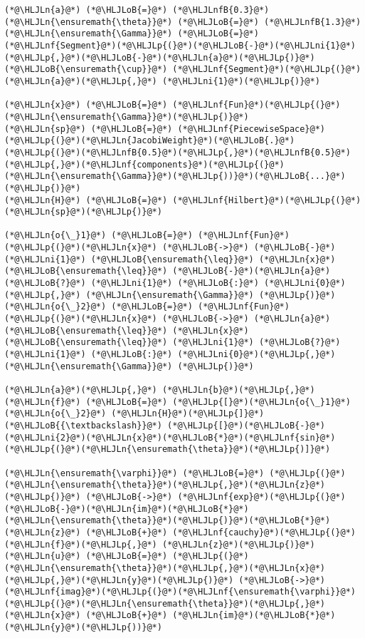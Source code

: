 \documentclass[12pt,a4paper]{article}
\newcommand{\HLJLn}[1]{#1}
\newcommand{\HLJLnf}[1]{\textcolor[RGB]{66,102,213}{#1}}
\newcommand{\HLJLnfB}[1]{\textcolor[RGB]{59,151,46}{#1}}
\newcommand{\HLJLni}[1]{\textcolor[RGB]{59,151,46}{#1}}
\newcommand{\HLJLoB}[1]{\textcolor[RGB]{102,102,102}{\textbf{#1}}}
\newcommand{\HLJLp}[1]{#1}
\begin{document}
\begin{lstlisting}
(*@\HLJLn{a}@*) (*@\HLJLoB{=}@*) (*@\HLJLnfB{0.3}@*)
(*@\HLJLn{\ensuremath{\theta}}@*) (*@\HLJLoB{=}@*) (*@\HLJLnfB{1.3}@*)
(*@\HLJLn{\ensuremath{\Gamma}}@*) (*@\HLJLoB{=}@*) (*@\HLJLnf{Segment}@*)(*@\HLJLp{(}@*)(*@\HLJLoB{-}@*)(*@\HLJLni{1}@*)(*@\HLJLp{,}@*)(*@\HLJLoB{-}@*)(*@\HLJLn{a}@*)(*@\HLJLp{)}@*) (*@\HLJLoB{\ensuremath{\cup}}@*) (*@\HLJLnf{Segment}@*)(*@\HLJLp{(}@*)(*@\HLJLn{a}@*)(*@\HLJLp{,}@*) (*@\HLJLni{1}@*)(*@\HLJLp{)}@*)

(*@\HLJLn{x}@*) (*@\HLJLoB{=}@*) (*@\HLJLnf{Fun}@*)(*@\HLJLp{(}@*)(*@\HLJLn{\ensuremath{\Gamma}}@*)(*@\HLJLp{)}@*)
(*@\HLJLn{sp}@*) (*@\HLJLoB{=}@*) (*@\HLJLnf{PiecewiseSpace}@*)(*@\HLJLp{(}@*)(*@\HLJLn{JacobiWeight}@*)(*@\HLJLoB{.}@*)(*@\HLJLp{(}@*)(*@\HLJLnfB{0.5}@*)(*@\HLJLp{,}@*)(*@\HLJLnfB{0.5}@*)(*@\HLJLp{,}@*)(*@\HLJLnf{components}@*)(*@\HLJLp{(}@*)(*@\HLJLn{\ensuremath{\Gamma}}@*)(*@\HLJLp{))}@*)(*@\HLJLoB{...}@*)(*@\HLJLp{)}@*)
(*@\HLJLn{H}@*) (*@\HLJLoB{=}@*) (*@\HLJLnf{Hilbert}@*)(*@\HLJLp{(}@*)(*@\HLJLn{sp}@*)(*@\HLJLp{)}@*)

(*@\HLJLn{o{\_}1}@*) (*@\HLJLoB{=}@*) (*@\HLJLnf{Fun}@*)(*@\HLJLp{(}@*)(*@\HLJLn{x}@*) (*@\HLJLoB{->}@*) (*@\HLJLoB{-}@*)(*@\HLJLni{1}@*) (*@\HLJLoB{\ensuremath{\leq}}@*) (*@\HLJLn{x}@*) (*@\HLJLoB{\ensuremath{\leq}}@*) (*@\HLJLoB{-}@*)(*@\HLJLn{a}@*) (*@\HLJLoB{?}@*) (*@\HLJLni{1}@*) (*@\HLJLoB{:}@*) (*@\HLJLni{0}@*)(*@\HLJLp{,}@*) (*@\HLJLn{\ensuremath{\Gamma}}@*) (*@\HLJLp{)}@*)
(*@\HLJLn{o{\_}2}@*) (*@\HLJLoB{=}@*) (*@\HLJLnf{Fun}@*)(*@\HLJLp{(}@*)(*@\HLJLn{x}@*) (*@\HLJLoB{->}@*) (*@\HLJLn{a}@*) (*@\HLJLoB{\ensuremath{\leq}}@*) (*@\HLJLn{x}@*) (*@\HLJLoB{\ensuremath{\leq}}@*) (*@\HLJLni{1}@*) (*@\HLJLoB{?}@*) (*@\HLJLni{1}@*) (*@\HLJLoB{:}@*) (*@\HLJLni{0}@*)(*@\HLJLp{,}@*) (*@\HLJLn{\ensuremath{\Gamma}}@*) (*@\HLJLp{)}@*)

(*@\HLJLn{a}@*)(*@\HLJLp{,}@*) (*@\HLJLn{b}@*)(*@\HLJLp{,}@*) (*@\HLJLn{f}@*) (*@\HLJLoB{=}@*) (*@\HLJLp{[}@*)(*@\HLJLn{o{\_}1}@*) (*@\HLJLn{o{\_}2}@*) (*@\HLJLn{H}@*)(*@\HLJLp{]}@*) (*@\HLJLoB{{\textbackslash}}@*) (*@\HLJLp{[}@*)(*@\HLJLoB{-}@*)(*@\HLJLni{2}@*)(*@\HLJLn{x}@*)(*@\HLJLoB{*}@*)(*@\HLJLnf{sin}@*)(*@\HLJLp{(}@*)(*@\HLJLn{\ensuremath{\theta}}@*)(*@\HLJLp{)]}@*)

(*@\HLJLn{\ensuremath{\varphi}}@*) (*@\HLJLoB{=}@*) (*@\HLJLp{(}@*)(*@\HLJLn{\ensuremath{\theta}}@*)(*@\HLJLp{,}@*)(*@\HLJLn{z}@*)(*@\HLJLp{)}@*) (*@\HLJLoB{->}@*) (*@\HLJLnf{exp}@*)(*@\HLJLp{(}@*)(*@\HLJLoB{-}@*)(*@\HLJLn{im}@*)(*@\HLJLoB{*}@*)(*@\HLJLn{\ensuremath{\theta}}@*)(*@\HLJLp{)}@*)(*@\HLJLoB{*}@*)(*@\HLJLn{z}@*) (*@\HLJLoB{+}@*) (*@\HLJLnf{cauchy}@*)(*@\HLJLp{(}@*)(*@\HLJLn{f}@*)(*@\HLJLp{,}@*) (*@\HLJLn{z}@*)(*@\HLJLp{)}@*)
(*@\HLJLn{u}@*) (*@\HLJLoB{=}@*) (*@\HLJLp{(}@*)(*@\HLJLn{\ensuremath{\theta}}@*)(*@\HLJLp{,}@*)(*@\HLJLn{x}@*)(*@\HLJLp{,}@*)(*@\HLJLn{y}@*)(*@\HLJLp{)}@*) (*@\HLJLoB{->}@*) (*@\HLJLnf{imag}@*)(*@\HLJLp{(}@*)(*@\HLJLnf{\ensuremath{\varphi}}@*)(*@\HLJLp{(}@*)(*@\HLJLn{\ensuremath{\theta}}@*)(*@\HLJLp{,}@*) (*@\HLJLn{x}@*) (*@\HLJLoB{+}@*) (*@\HLJLn{im}@*)(*@\HLJLoB{*}@*)(*@\HLJLn{y}@*)(*@\HLJLp{))}@*)


\end{lstlisting}
\end{document}
